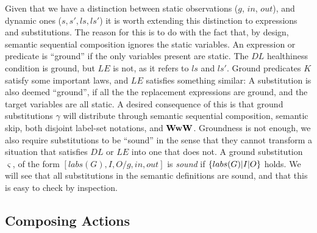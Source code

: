 Given that we have a distinction between static observations ($g$, $in$, $out$),
and dynamic ones ($s,s',ls,ls'$) it is worth extending this distinction
to expressions and substitutions.
The reason for this is to do with the fact that, by design,
semantic sequential composition ignores the static variables.
An expression or predicate is ``ground''
if the only variables present are static.
The $DL$ healthiness condition is ground,
but $LE$ is not, as it refers to $ls$ and $ls'$.
Ground predicates $K$ satisfy some important laws,
and $LE$ satisfies something similar:
 \noindent
A substitution is also deemed ``ground'',
if all the the replacement expressions are ground,
and the target variables are all static.
A desired consequence of this is that
ground substitutions $\gamma$
will distribute through semantic sequential composition,
semantic skip,
both disjoint label-set notations,
and $\mathbf{WwW}$.
Groundness is not enough,
we also require substitutions to be ``sound'' in the sense that
they cannot transform a situation that satisfies $DL$
or $LE$ into one that does not.
A ground substitution $\varsigma$,
of the form $[labs(G),I,O/g,in,out]$ is \emph{sound}
if $\{{labs(G)|I|O}\}$ holds.
We will see that all substitutions in the semantic definitions are sound,
and that this is easy to check by inspection.


\subsection{Composing Actions}\label{ssec:composing}

